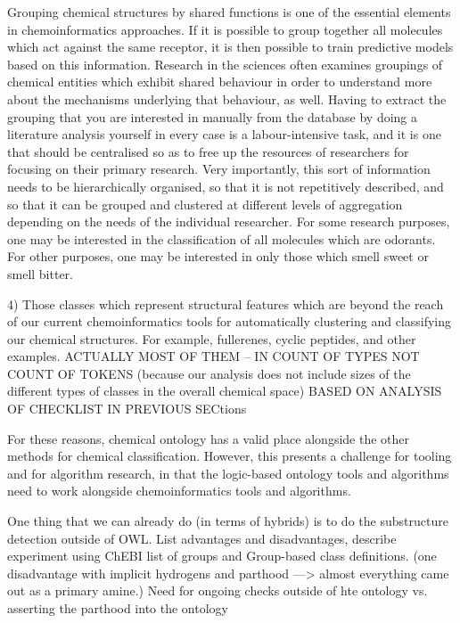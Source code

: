 \documentclass[10pt]{bmc_article}
\newenvironment{bmcformat}{\baselineskip20pt\sloppy\setboolean{publ}{false}}{\baselineskip20pt\sloppy}
\begin{document}
\begin{bmcformat}
Grouping chemical structures by shared functions is one of the essential elements in chemoinformatics approaches.  If it is possible to group together all molecules which act against the same receptor, it is then possible to train predictive models based on this information.   %
Research in the sciences often examines groupings of chemical entities which exhibit shared behaviour in order to understand more about the mechanisms underlying that behaviour, as well. 
Having to extract the grouping that you are interested in manually from the database by doing a literature analysis yourself in every case is a labour-intensive task, and it is one that should be centralised so as to free up the resources of researchers for focusing on their primary research. 
Very importantly, this sort of information needs to be hierarchically organised, so that it is not repetitively described, and so that it can be grouped and clustered at different levels of aggregation depending on the needs of the individual researcher.  For some research purposes, one may be interested in the classification of all molecules which are odorants. For other purposes, one may be interested in only those which smell sweet or smell bitter. 

4) Those classes which represent structural features which are beyond the reach of our current chemoinformatics tools for automatically clustering and classifying our chemical structures. For example, fullerenes, cyclic peptides, and other examples. 
ACTUALLY MOST OF THEM -- IN COUNT OF TYPES NOT COUNT OF TOKENS (because our analysis does not include sizes of the different types of classes in the overall chemical space)
BASED ON ANALYSIS OF CHECKLIST IN PREVIOUS SECtions



For these reasons, chemical ontology has a valid place alongside the other methods for chemical classification.  However, this presents a challenge for tooling and for algorithm research, in that the logic-based ontology tools and algorithms need to work alongside chemoinformatics tools and algorithms. 

One thing that we can already do (in terms of hybrids) is to do the substructure detection outside of OWL.  List advantages and disadvantages, describe experiment using ChEBI list of groups and Group-based class definitions.  (one disadvantage with implicit hydrogens and parthood ---> almost everything came out as a primary amine.)  Need for ongoing checks outside of hte ontology vs. asserting the parthood into the ontology



\end{bmcformat}
\end{document}
